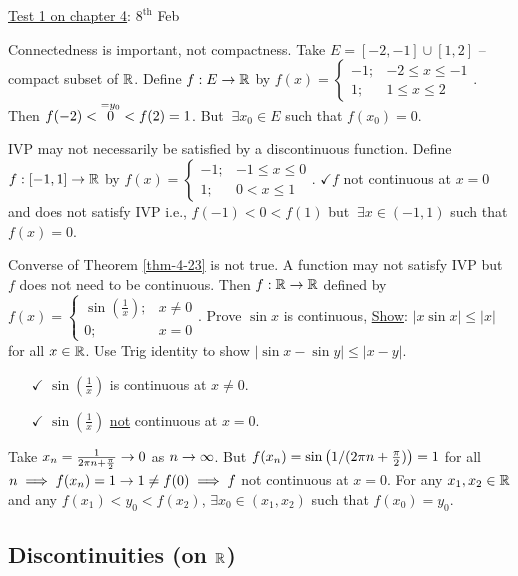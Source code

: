 \documentclass[]{article}
\begin{document}
\ul{Test 1 on chapter 4}: $8^\text{th}$ Feb

\begin{example}
	Connectedness is important, not compactness.
	Take $E = [-2,-1]\cup[1,2]$ -- compact subset of $\mathbb{R}$.
	Define $f:E\rightarrow\mathbb{R}$ by $f(x) = \begin{cases} -1; & -2 \leq x\leq -1 \\ 1; & 1\leq x\leq 2 \end{cases}$.
		Then $f(-2)<\overset{=y_0}{0}<f(2) = 1$.
	But $~\exists x_0\in E$ such that $f(x_0)=0$.
\end{example}
\begin{example}
	IVP may not necessarily be satisfied by a discontinuous function.
Define $f:[-1,1]\rightarrow\mathbb{R}$ by $f(x) = \begin{cases} -1; & -1\leq x\leq0 \\ 1; & 0<x\leq 1 \end{cases}$. $\checkmark f$ not continuous at $x=0$ and does not satisfy IVP i.e., $f(-1) < 0 < f(1)$ but $~\exists x\in(-1,1)$ such that $f(x) = 0$.
\end{example}
\begin{example}
	Converse of Theorem \ref{thm-4-23} is not true. A function may not satisfy IVP but $f$ does not need to be continuous.
	Then $f:\mathbb{R}\rightarrow\mathbb{R}$ defined by $f(x) = \begin{cases} \sin(\frac1x); & x\neq 0 \\ 0; & x=0 \end{cases}$.
		Prove $\sin x$ is continuous, \ul{Show}: $|x\sin x|\leq |x|$ for all $x\in \mathbb{R}$.
	Use Trig identity to show $|\sin x-\sin y|\leq |x-y|$.
	\begin{enumerate}
		\item[$\checkmark$] $\sin(\frac1x)$ is continuous at $x\neq 0$.
		\item[$\checkmark$] $\sin(\frac1x)$ \ul{not} continuous at $x=0$.
	\end{enumerate}
	Take $x_n = \frac1{2\pi n+\frac\pi2}\rightarrow0$ as $n\rightarrow\infty$.
	But $f(x_n) = \sin\left(1/(2\pi n+\frac\pi2)\right) = 1$ for all $n \implies f(x_n) = 1\rightarrow 1\neq f(0) \implies f$ not continuous at $x=0$.
	For any $x_1,x_2\in\mathbb{R}$ and any $f(x_1)<y_0<f(x_2)$, $\exists x_0\in(x_1,x_2)$ such that $f(x_0)=y_0$.
\end{example}

\subsection*{Discontinuities (on $\mathbb{R}$)}
\end{document}
